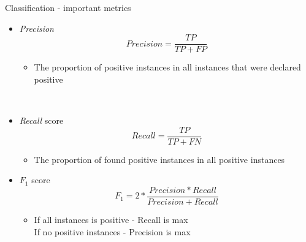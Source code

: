 \documentclass[aspectratio=169]{beamer}
\begin{document}
\begin{frame}{Classification - important metrics}
    \begin{itemize}
        \item \textit{Precision}
            $$ Precision = \frac{TP}{TP + FP} $$
        \begin{itemize}
            \item The proportion of positive instances in all instances that were declared positive
        \end{itemize}\\
        \item \textit{Recall} score
            $$ Recall = \frac{TP}{TP + FN} $$
        \begin{itemize}
            \item The proportion of found positive instances in all positive instances
        \end{itemize}
        \item $F_1$ score
            $$ F_1 = 2*\frac{Precision*Recall}{Precision+Recall} $$
        \begin{itemize}
            \item If all instances is positive - Recall is max \\
            If no positive instances - Precision is max
        \end{itemize}
    \end{itemize}
\end{frame}
\end{document}
